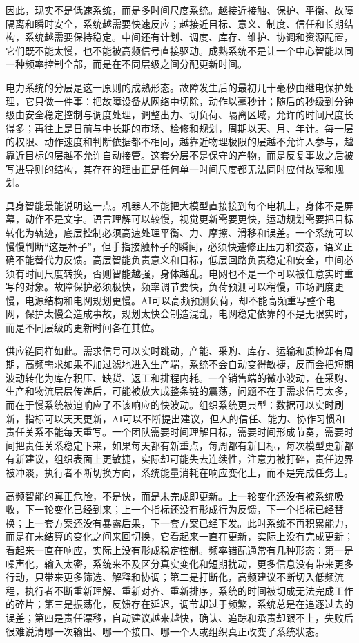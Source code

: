 因此，现实不是低速系统，而是多时间尺度系统。越接近接触、保护、平衡、故障隔离和瞬时安全，系统越需要快速反应；越接近目标、意义、制度、信任和长期结构，系统越需要保持稳定。中间还有计划、调度、库存、维护、协调和资源配置，它们既不能太慢，也不能被高频信号直接驱动。成熟系统不是让一个中心智能以同一种频率控制全部，而是在不同层级之间分配更新时间。

电力系统的分层是这一原则的成熟形态。故障发生后的最初几十毫秒由继电保护处理，它只做一件事：把故障设备从网络中切除，动作以毫秒计；随后的秒级到分钟级由安全稳定控制与调度处理，调整出力、切负荷、隔离区域，允许的时间尺度长得多；再往上是日前与中长期的市场、检修和规划，周期以天、月、年计。每一层的权限、动作速度和判断依据都不相同，越靠近物理极限的层越不允许人参与，越靠近目标的层越不允许自动接管。这套分层不是保守的产物，而是反复事故之后被写进导则的结构，其存在的理由正是任何单一时间尺度都无法同时应付故障和规划。

具身智能最能说明这一点。机器人不能把大模型直接接到每个电机上，身体不是屏幕，动作不是文字。语言理解可以较慢，视觉更新需要更快，运动规划需要把目标转化为轨迹，底层控制必须高速处理平衡、力、摩擦、滑移和误差。一个系统可以慢慢判断“这是杯子”，但手指接触杯子的瞬间，必须快速修正压力和姿态，语义正确不能替代力反馈。高层智能负责意义和目标，低层回路负责稳定和安全，中间必须有时间尺度转换，否则智能越强，身体越乱。电网也不是一个可以被任意实时重写的对象。故障保护必须极快，频率调节要快，负荷预测可以稍慢，市场调度更慢，电源结构和电网规划更慢。AI可以高频预测负荷，却不能高频重写整个电网，保护太慢会造成事故，规划太快会制造混乱，电网稳定依靠的不是无限实时，而是不同层级的更新时间各在其位。


供应链同样如此。需求信号可以实时跳动，产能、采购、库存、运输和质检却有周期，高频需求如果不加过滤地进入生产端，系统不会自动变得敏捷，反而会把短期波动转化为库存积压、缺货、返工和排程内耗。一个销售端的微小波动，在采购、生产和物流层层传递后，可能被放大成整条链的震荡，问题不在于需求信号太多，而在于慢系统被迫响应了不该响应的快波动。组织系统更典型：数据可以实时刷新，指标可以天天更新，AI可以不断提出建议，但人的信任、能力、协作习惯和责任关系不能每天重写。一个团队需要时间理解目标，需要时间形成节奏，需要时间把责任关系稳定下来，如果每天都有新重点，每周都有新目标，每次模型更新都有新建议，组织表面上更敏捷，实际却可能失去连续性，注意力被打碎，责任边界被冲淡，执行者不断切换方向，系统能量消耗在响应变化上，而不是完成任务上。

高频智能的真正危险，不是快，而是未完成即更新。上一轮变化还没有被系统吸收，下一轮变化已经到来；上一个指标还没有形成行为反馈，下一个指标已经替换；上一套方案还没有暴露后果，下一套方案已经下发。此时系统不再积累能力，而是在未结算的变化之间来回切换，它看起来一直在更新，实际上没有完成更新；看起来一直在响应，实际上没有形成稳定控制。频率错配通常有几种形态：第一是噪声化，输入太密，系统来不及区分真实变化和短期扰动，更多信息没有带来更多行动，只带来更多筛选、解释和协调；第二是打断化，高频建议不断切入低频流程，执行者不断重新理解、重新对齐、重新排序，系统的时间被切成无法完成工作的碎片；第三是振荡化，反馈存在延迟，调节却过于频繁，系统总是在追逐过去的误差；第四是责任漂移，自动建议越来越快，确认、追踪和承责却跟不上，失败后很难说清哪一次输出、哪一个接口、哪一个人或组织真正改变了系统状态。

